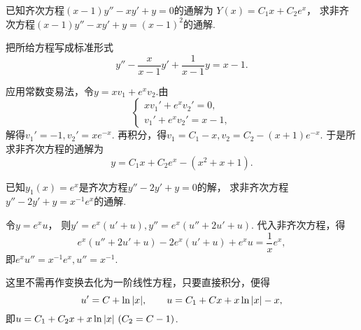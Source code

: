 \begin{example}
已知齐次方程\((x-1)y'' - xy' + y = 0\)的通解为
\(Y(x) = C_1 x + C_2 e^x\)，
求非齐次方程\((x-1)y'' - xy' + y = (x-1)^2\)的通解.
\begin{solution}
把所给方程写成标准形式\[
	y'' - \frac{x}{x-1} y' + \frac{1}{x-1} y = x-1.
\]

应用常数变易法，令\(y = x v_1 + e^x v_2\).由\[
	\left\{ \begin{array}{l}
		x v_1' + e^x v_2' = 0, \\
		v_1' + e^x v_2' = x-1,
	\end{array} \right.
\]
解得\(v_1' = -1, v_2' = x e^{-x}\).
再积分，得\(v_1 = C_1 - x, v_2 = C_2 - (x+1) e^{-x}\).
于是所求非齐次方程的通解为\[
	y = C_1 x + C_2 e^x - (x^2+x+1).
\]
\end{solution}
\end{example}

\begin{example}
已知\(y_1(x) = e^x\)是齐次方程\(y'' - 2y' + y = 0\)的解，
求非齐次方程\(y'' - 2y' + y = x^{-1} e^x\)的通解.
\begin{solution}
令\(y = e^x u\)，
则\(y' = e^x (u'+u), y'' = e^x (u''+2u'+u)\).
代入非齐次方程，得\[
	e^x (u''+2u'+u) - 2e^x (u'+u) + e^x u = \frac{1}{x} e^x,
\]
即\(e^x u'' = x^{-1} e^x, u'' = x^{-1}\).

这里不需再作变换去化为一阶线性方程，只要直接积分，便得\[
	u' = C + \ln\abs{x},
	\qquad
	u = C_1 + C x + x\ln\abs{x} - x,
\]
即\(u = C_1 + C_2 x + x \ln\abs{x}\ (C_2=C-1)\).
\end{solution}
\end{example}
